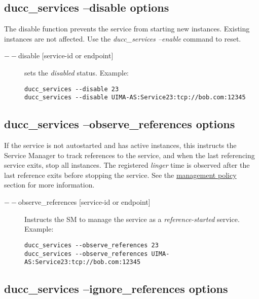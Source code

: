     \subsection{ducc\_services --disable options}

    The disable function prevents the service from starting new instances.  Existing instances are not affected.
    Use the {\em ducc\_services --enable} command to reset.
    
       \begin{description}
       \item[$--$disable {[service-id or endpoint]}] sets the {\em disabled} status. Example:
\begin{verbatim}
ducc_services --disable 23 
ducc_services --disable UIMA-AS:Service23:tcp://bob.com:12345 
\end{verbatim}
         
       \end{description}


    \subsection{ducc\_services --observe\_references  options}

    If the service is not autostarted and has active instances, this instructs the Service Manager
    to track references to the service, and when the last referencing service exits, stop all
    instances.  The registered {\em linger} time is observed after the last reference exits before
    stopping the service.  See the \hyperref[sec:service.management-policy]{management policy} section for
    more information. 

       \begin{description}
       \item[$--$observe\_references {[service-id or endpoint]}] Instructs the SM to manage the
         service as a {\em reference-started} service. Example:
\begin{verbatim}
ducc_services --observe_references 23 
ducc_services --observe_references UIMA-AS:Service23:tcp://bob.com:12345 
\end{verbatim}
         
       \end{description}

    \subsection{ducc\_services --ignore\_references  options}

